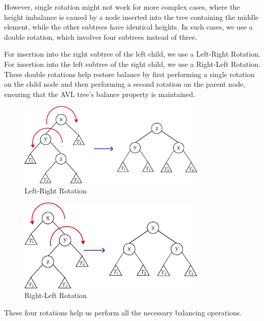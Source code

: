 However, single rotation might not work for more complex cases, where the height imbalance is caused by a node inserted into the tree containing the middle element, while the other subtrees have identical heights. In such cases, we use a double rotation, which involves four subtrees instead of three.

For insertion into the right subtree of the left child, we use a Left-Right Rotation. For insertion into the left subtree of the right child, we use a Right-Left Rotation. These double rotations help restore balance by first performing a single rotation on the child node and then performing a second rotation on the parent node, ensuring that the AVL tree's balance property is maintained.

\begin{minipage}{0.5\textwidth}
\begin{figure}[H]
  \centering
  \includegraphics[width=0.8\textwidth]{Figure/LR.pdf}
  \caption{Left-Right Rotation}
\end{figure}
\end{minipage}
\begin{minipage}{0.5\textwidth}
\begin{figure}[H]
  \centering
  \includegraphics[width=0.8\textwidth]{Figure/RL.pdf}
  \caption{Right-Left Rotation}
\end{figure}
\end{minipage} 

These four rotations help us perform all the necessary balancing operations.

